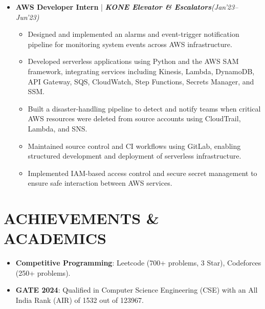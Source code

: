\documentclass[a4paper,10pt]{article}
\begin{document}
\begin{itemize}
    \item \textbf{AWS Developer Intern} | \textbf{\emph{KONE Elevator \& Escalators}}\hfill \emph{(Jan'23–Jun'23)}
    \begin{itemize}
        \item Designed and implemented an alarms and event-trigger notification pipeline for monitoring system events across AWS infrastructure.
        \item Developed serverless applications using Python and the AWS SAM framework, integrating services including Kinesis, Lambda, DynamoDB, API Gateway, SQS, CloudWatch, Step Functions, Secrets Manager, and SSM.
        \item Built a disaster-handling pipeline to detect and notify teams when critical AWS resources were deleted from source accounts using CloudTrail, Lambda, and SNS.
        \item Maintained source control and CI workflows using GitLab, enabling structured development and deployment of serverless infrastructure.
        \item Implemented IAM-based access control and secure secret management to ensure safe interaction between AWS services.
    \end{itemize}

\end{itemize}

\section*{ACHIEVEMENTS \& ACADEMICS}
\begin{itemize}
  \item \textbf{Competitive Programming}: Leetcode (700+ problems, 3 Star), Codeforces (250+ problems).
  \item \textbf{GATE 2024}: Qualified in Computer Science Engineering (CSE) with an All India Rank (AIR) of 1532 out of 123967.
\end{itemize}

\end{document}
